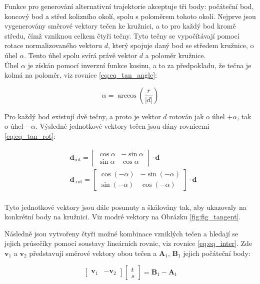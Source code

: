 \documentclass[a4paper,12pt]{article}
\begin{document}
Funkce pro generování alternativní trajektorie akceptuje tři body: počáteční bod, koncový bod a střed kolizního okolí, spolu s poloměrem tohoto okolí. Nejprve jsou vygenerovány směrové vektory tečen ke kružnici, a to pro každý bod kromě středu, čímž vzniknou celkem čtyři tečny. Tyto tečny se vypočítávají pomocí rotace normalizovaného vektoru $d$, který spojuje daný bod se středem kružnice, o úhel $\alpha$. Tento úhel spolu svírá právě vektor $d$ a poloměr kružnice.\\
Úhel $\alpha$ je získán pomocí inverzní funkce kosinu, a to za předpokladu, že tečna je kolmá na poloměr, viz rovnice \ref{eq:eq_tan_angle}:

\begin{equation}
	\alpha = \arccos(\frac{r}{|d|})
	\label{eq:eq_tan_angle}
\end{equation} 

Pro každý bod existují dvě tečny, a proto je vektor $d$ rotován jak o úhel $+\alpha$, tak o úhel $-\alpha$. Výsledné jednotkové vektory tečen jsou dány rovnicemi \ref{eq:eq_tan_rot}:

\begin{equation}
	\begin{aligned}
		&\mathbf{d}_{\text{rot}} =
		\begin{bmatrix}
			\cos\alpha & -\sin\alpha \\
			\sin\alpha & \cos\alpha
		\end{bmatrix}
		\cdot \mathbf{d} \\
		&\mathbf{d}_{\text{-rot}} =
		\begin{bmatrix}
			\cos(-\alpha) & -\sin(-\alpha) \\
			\sin(-\alpha) & \cos(-\alpha)
		\end{bmatrix}
		\cdot \mathbf{d} \\
	\end{aligned}
	\label{eq:eq_tan_rot}
\end{equation}

Tyto jednotkové vektory jsou dále posunuty a škálovány tak, aby ukazovaly na konkrétní body na kružnici. Viz modré vektory na Obrázku \ref{fig:fig_tangent}.

Následně jsou vytvořeny čtyři možné kombinace vzniklých tečen a hledají se jejich průsečíky pomocí soustavy lineárních rovnic, viz rovnice \ref{eq:eq_inter}. Zde $\mathbf{v}_1$ a $\mathbf{v}_2$ představují směrové vektory obou tečen a $\mathbf{A}_1$, $\mathbf{B}_1$ jejich počáteční body:

\begin{equation}
	\begin{bmatrix}
		\mathbf{v}_1 & -\mathbf{v}_2
	\end{bmatrix}
	\begin{bmatrix}
		t \\
		s
	\end{bmatrix}
	=
	\mathbf{B}_1 - \mathbf{A}_1
	\label{eq:eq_inter}
\end{equation}
\end{document}

